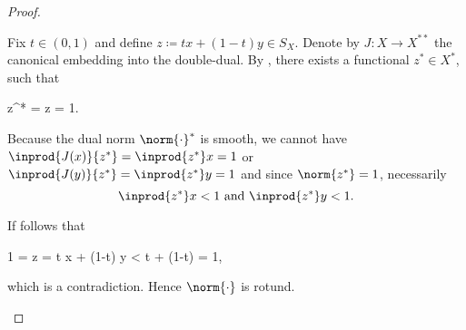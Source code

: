 \begin{proof}
\begin{enumerate}
          Fix \( t \in (0, 1) \) and define \( z \coloneqq tx + (1-t)y \in S_X \). Denote by \( J: X \to X^{**} \) the canonical embedding into the double-dual. By , there exists a functional \( z^* \in X^* \), such that
          \begin{balign*}
             {z^*}
            =
             z
            =
            1.
          \end{balign*}

          Because the dual norm \( \norm{\cdot}^* \) is smooth, we cannot have \( \inprod{J(x)} {z^*} =  \inprod{z^*} x = 1 \) or \( \inprod{J(y)} {z^*} = \inprod{z^*} y = 1 \) and since \( \norm{z^*} = 1 \), necessarily
          \begin{equation*}
            \inprod{z^*} x < 1 \text{ and } \inprod{z^*} y < 1.
          \end{equation*}

          If follows that
          \begin{balign*}
            1
            =
             z
            =
            t  x + (1-t)  y
            <
            t + (1-t)
            =
            1,
          \end{balign*}
          which is a contradiction. Hence \( \norm{\cdot} \) is rotund.
  \end{enumerate}
\end{proof}

